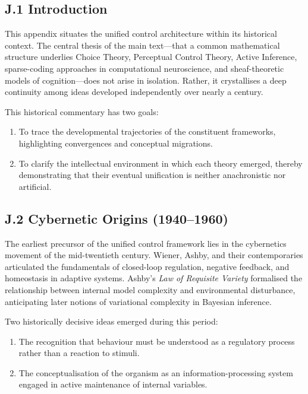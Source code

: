 \documentclass[11pt,a4paper,twoside]{article}
\begin{document}
\subsection*{J.1 Introduction}

This appendix situates the unified control architecture within its historical context.
The central thesis of the main text---that a common mathematical structure underlies Choice Theory, Perceptual Control Theory, Active Inference, sparse-coding approaches in computational neuroscience, and sheaf-theoretic models of cognition---does not arise in isolation.
Rather, it crystallises a deep continuity among ideas developed independently over nearly a century.

This historical commentary has two goals:

\begin{enumerate}
\item To trace the developmental trajectories of the constituent frameworks, highlighting convergences and conceptual migrations.
\item To clarify the intellectual environment in which each theory emerged, thereby demonstrating that their eventual unification is neither anachronistic nor artificial.
\end{enumerate}

\subsection*{J.2 Cybernetic Origins (1940--1960)}

The earliest precursor of the unified control framework lies in the cybernetics movement of the mid-twentieth century.
Wiener, Ashby, and their contemporaries articulated the fundamentals of closed-loop regulation, negative feedback, and homeostasis in adaptive systems.
Ashby’s \emph{Law of Requisite Variety} formalised the relationship between internal model complexity and environmental disturbance, anticipating later notions of variational complexity in Bayesian inference.

Two historically decisive ideas emerged during this period:

\begin{enumerate}
\item The recognition that behaviour must be understood as a regulatory process rather than a reaction to stimuli.
\item The conceptualisation of the organism as an information-processing system engaged in active maintenance of internal variables.
\end{enumerate}
\end{document}

